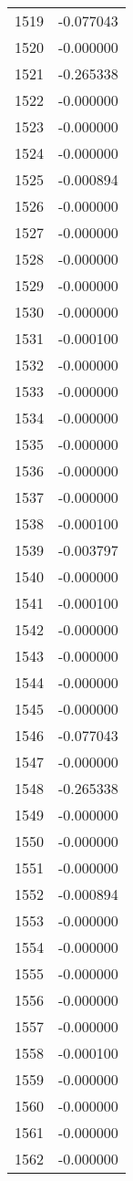 \documentclass[12pt]{article}
\begin{document}
\begin{longtable}{@{}cc@{}}
1519 & -0.077043 \\
1520 & -0.000000 \\
1521 & -0.265338 \\
1522 & -0.000000 \\
1523 & -0.000000 \\
1524 & -0.000000 \\
1525 & -0.000894 \\
1526 & -0.000000 \\
1527 & -0.000000 \\
1528 & -0.000000 \\
1529 & -0.000000 \\
1530 & -0.000000 \\
1531 & -0.000100 \\
1532 & -0.000000 \\
1533 & -0.000000 \\
1534 & -0.000000 \\
1535 & -0.000000 \\
1536 & -0.000000 \\
1537 & -0.000000 \\
1538 & -0.000100 \\
1539 & -0.003797 \\
1540 & -0.000000 \\
1541 & -0.000100 \\
1542 & -0.000000 \\
1543 & -0.000000 \\
1544 & -0.000000 \\
1545 & -0.000000 \\
1546 & -0.077043 \\
1547 & -0.000000 \\
1548 & -0.265338 \\
1549 & -0.000000 \\
1550 & -0.000000 \\
1551 & -0.000000 \\
1552 & -0.000894 \\
1553 & -0.000000 \\
1554 & -0.000000 \\
1555 & -0.000000 \\
1556 & -0.000000 \\
1557 & -0.000000 \\
1558 & -0.000100 \\
1559 & -0.000000 \\
1560 & -0.000000 \\
1561 & -0.000000 \\
1562 & -0.000000 \\

\end{longtable}
\end{document}
